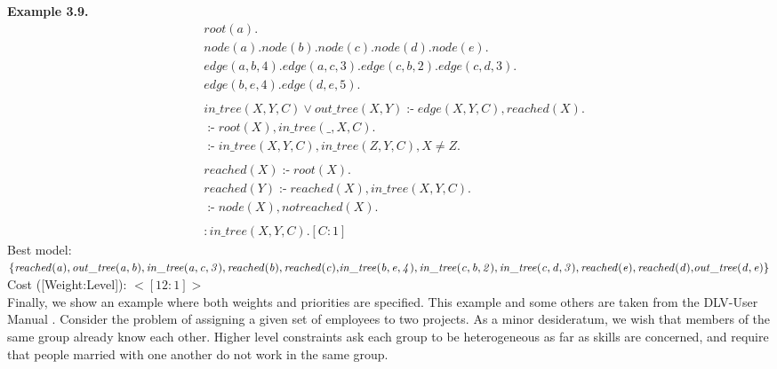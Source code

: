 \documentclass[14pt,a4paper, titlepage]{article}
\DeclareMathOperator{\leftimpl}{:-}
\begin{document}
\textbf{Example 3.9.}
\begin{align*}
& \mathit{root}(a). \\
& \mathit{node}(a). \mathit{node}(b). \mathit{node}(c). \mathit{node}(d). \mathit{node}(e). \\
& \mathit{edge}(a,b,4). \mathit{edge}(a,c,3). \mathit{edge}(c,b,2). \mathit{edge}(c,d,3). \\
& \mathit{edge}(b,e,4). \mathit{edge}(d,e,5). \\
& \\
& \mathit{in\_tree}(X,Y,C) \vee \mathit{out\_tree}(X,Y) \leftimpl \mathit{edge}(X,Y,C), \mathit{reached}(X). \\
& \leftimpl \mathit{root}(X), \mathit{in\_tree}(\_,X,C).\\
& \leftimpl \mathit{in\_tree}(X,Y,C), \mathit{in\_tree}(Z,Y,C), X \neq Z. \\
&  \\
& \mathit{reached}(X) \leftimpl \mathit{root}(X). \\
& \mathit{reached}(Y) \leftimpl \mathit{reached}(X), \mathit{in\_tree}(X,Y,C). \\
& \leftimpl \mathit{node}(X), \mathit{not} \mathit{reached}(X). \\
&   \\
& : \mathit{in\_tree}(X,Y,C). [C:1]
\end{align*}
Best model: $\mathit{\{reached(a), out\_tree(a,b), in\_tree(a,c,3), reached(b), reached(c),}\\ \mathit{ in\_tree(b,e,4), in\_tree(c,b,2), in\_tree(c,d,3), reached(e), reached(d),} \\ \mathit{  out\_tree(d,e)\}}$
\\Cost ([Weight:Level]): $<[12:1]>$
\\Finally, we show an example where both weights and priorities are specified. This example and some others are taken from the DLV-User Manual \cite{dlvum}. Consider the problem of assigning a given set of employees to two projects. As a minor desideratum, we wish that members of the same group already know each other. Higher level constraints ask each group to be heterogeneous as far as skills are concerned, and require that people married with one another do not work in the same group.
\end{document}
